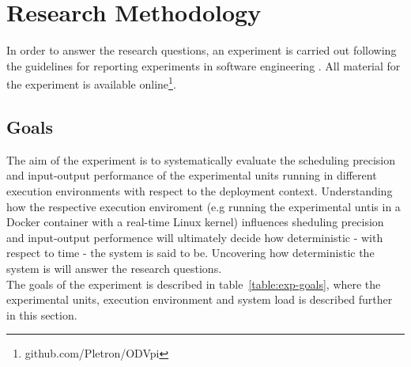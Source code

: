 \iffalse  \fi
\chapter{Research Methodology}\label{section:methodology}

In order to answer the research questions, an experiment is carried out following the guidelines for reporting experiments in software engineering \cite{Andreas}. All material for the experiment is available online\footnote{github.com/Pletron/ODVpi}. 


\section{Goals}
The aim of the experiment is to systematically evaluate the scheduling precision and input-output performance of the experimental units running in different execution environments with respect to the deployment context. Understanding how the respective execution enviroment (e.g running the experimental untis in a Docker container with a real-time Linux kernel) influences sheduling precision and input-output performence will ultimately decide how deterministic - with respect to time - the system is said to be. Uncovering how deterministic the system is will answer the research questions. \\

The goals of the experiment is described in table~\ref{table:exp-goals}, where the experimental units, execution environment and system load is described further in this section. 


